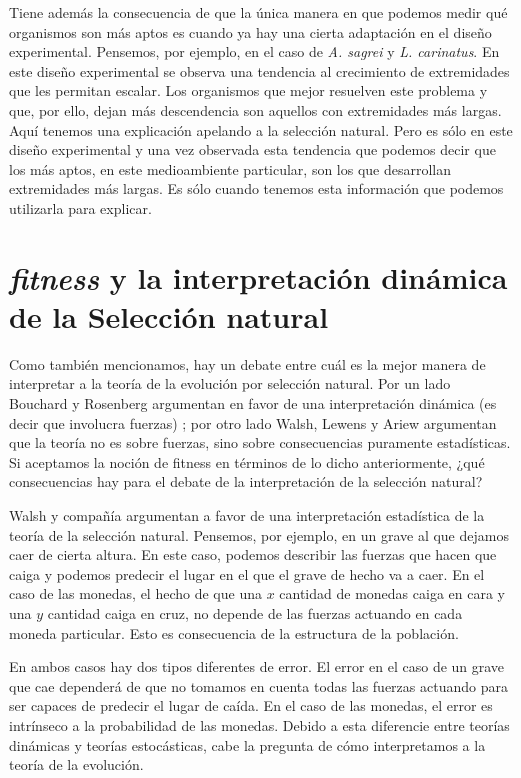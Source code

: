 Tiene además la consecuencia de que la única manera en que podemos medir qué organismos son más aptos es cuando ya hay una cierta adaptación en el diseño experimental. Pensemos, por ejemplo, en el caso de \emph{A. sagrei} y \emph{L. carinatus}. En este diseño experimental se observa una tendencia al crecimiento de extremidades que les permitan escalar. Los organismos que mejor resuelven este problema y que, por ello, dejan más descendencia son aquellos con extremidades más largas. Aquí tenemos una explicación apelando a la selección natural. Pero es sólo en este diseño experimental y una vez observada esta tendencia que podemos decir que los más aptos, en este medioambiente particular, son los que desarrollan extremidades más largas. Es sólo cuando tenemos esta información que podemos utilizarla para explicar.

\section{\emph{fitness} y la interpretación dinámica de la Selección natural}

Como también mencionamos, hay un debate entre cuál es la mejor manera de interpretar a la teoría de la evolución por selección natural. Por un lado Bouchard y Rosenberg argumentan en favor de una interpretación dinámica (es decir que involucra fuerzas) \citeyear{Bouchard2004}; por otro lado Walsh, Lewens y Ariew \citeyear{Walsh2002} argumentan que la teoría no es sobre fuerzas, sino sobre consecuencias puramente estadísticas. Si aceptamos la noción de fitness en términos de lo dicho anteriormente, ¿qué consecuencias hay para el debate de la interpretación de la selección natural?

Walsh y compañía argumentan a favor de una interpretación estadística de la teoría de la selección natural. Pensemos, por ejemplo, en un grave al que dejamos caer de cierta altura. En este caso, podemos describir las fuerzas que hacen que caiga y podemos predecir el lugar en el que el grave de hecho va a caer. En el caso de las monedas, el hecho de que una $x$ cantidad de monedas caiga en cara y una $y$ cantidad caiga en cruz, no depende de las fuerzas actuando en cada moneda particular. Esto es consecuencia de la estructura de la población.

En ambos casos hay dos tipos diferentes de error. El error en el caso de un grave que cae dependerá de que no tomamos en cuenta todas las fuerzas actuando para ser capaces de predecir el lugar de caída. En el caso de las monedas, el error es intrínseco a la probabilidad de las monedas. Debido a esta diferencie entre teorías dinámicas y teorías estocásticas, cabe la pregunta de cómo interpretamos a la teoría de la evolución.

